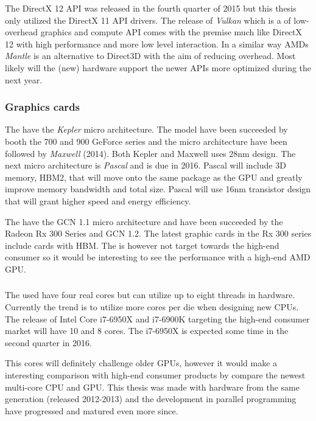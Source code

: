 The DirectX 12 \gls{API} was released in the fourth quarter of 2015 but this thesis only utilized the DirectX 11 API drivers. The release of \emph{Vulkan} which is a of low-overhead graphics and compute \gls{API} comes with the premise much like DirectX 12 with high performance and more low level interaction. In a similar way AMDs \emph{Mantle} is an alternative to Direct3D with the aim of reducing overhead. Most likely will the (new) hardware support the newer APIs more optimized during the next year.

\subsubsection{Graphics cards}

The {\NVCARD} have the \textit{Kepler} micro architecture. The model have been succeeded by booth the 700 and 900 GeForce series and the micro architecture have been followed by \textit{Maxwell} (2014). Both Kepler and Maxwell uses 28nm design. The next micro architecture is \textit{Pascal} and is due in 2016. Pascal will include 3D memory, \gls{HBM2}, that will move onto the same package as the GPU and greatly improve memory bandwidth and total size. Pascal will use 16nm transistor design that will grant higher speed and energy efficiency.

The {\AMDCARD} have the \gls{GCN} 1.1 micro architecture and have been succeeded by the Radeon Rx 300 Series and \gls{GCN} 1.2. The latest graphic cards in the Rx 300 series include cards with \gls{HBM}. The {\AMDCARD} is however not target towards the high-end consumer so it would be interesting to see the performance with a high-end AMD GPU.

\subsubsection{\INTELCPU}

The used {\INTELCPU} have four real cores but can utilize up to eight threads in hardware. Currently the trend is to utilize more cores per die when designing new CPUs. The release of Intel Core i7-6950X and i7-6900K targeting the high-end consumer market will have 10 and 8 cores. The i7-6950X is expected some time in the second quarter in 2016.

This cores will definitely challenge older GPUs, however it would make a interesting comparison with high-end consumer products by compare the newest multi-core CPU and GPU. This thesis was made with hardware from the same generation (released 2012-2013) and the development in parallel programming have progressed and matured even more since.